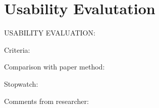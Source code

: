 \chapter{Usability Evalutation}
USABILITY EVALUATION:




Criteria:




Comparison with paper method:


Stopwatch:

    



Comments from researcher:
    
        
            

